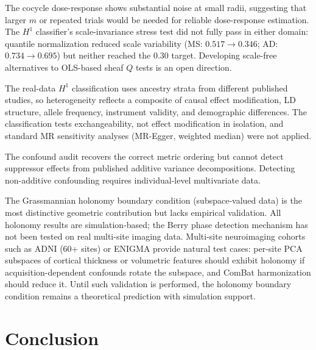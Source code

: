 \documentclass{article}
\begin{document}
The cocycle dose-response shows substantial noise at small radii, suggesting that larger $m$ or repeated trials would be needed for reliable dose-response estimation.
The $H^1$ classifier's scale-invariance stress test did not fully pass in either domain: quantile normalization reduced scale variability (MS: $0.517 \to 0.346$; AD: $0.734 \to 0.695$) but neither reached the $0.30$ target.
Developing scale-free alternatives to OLS-based sheaf $Q$ tests is an open direction.

The real-data $H^1$ classification uses ancestry strata from different published studies, so heterogeneity reflects a composite of causal effect modification, LD structure, allele frequency, instrument validity, and demographic differences.
The classification tests exchangeability, not effect modification in isolation, and standard MR sensitivity analyses (MR-Egger, weighted median) were not applied.

The confound audit recovers the correct metric ordering but cannot detect suppressor effects from published additive variance decompositions.
Detecting non-additive confounding requires individual-level multivariate data.

The Grassmannian holonomy boundary condition (subspace-valued data) is the most distinctive geometric contribution but lacks empirical validation.
All holonomy results are simulation-based; the Berry phase detection mechanism has not been tested on real multi-site imaging data.
Multi-site neuroimaging cohorts such as ADNI (60+ sites) or ENIGMA provide natural test cases: per-site PCA subspaces of cortical thickness or volumetric features should exhibit holonomy if acquisition-dependent confounds rotate the subspace, and ComBat harmonization \citep{fortin2018harmonization} should reduce it.
Until such validation is performed, the holonomy boundary condition remains a theoretical prediction with simulation support.

\section{Conclusion}
\label{sec:conclusion}
\end{document}
